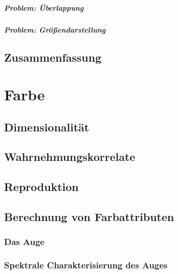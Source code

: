 \documentclass[a4paper, 11pt, accentcolor = tud3b]{tudreport}
\begin{document}
			\paragraph{Problem: Überlappung} %

			\paragraph{Problem: Größendarstellung} %

		\section{Zusammenfassung} %

	\chapter{Farbe} %

		\section{Dimensionalität} %

		\section{Wahrnehmungskorrelate} %

		\section{Reproduktion} %

		\section{Berechnung von Farbattributen} %

			\subsection{Das Auge} %

			\subsection{Spektrale Charakterisierung des Auges} %
\end{document}
